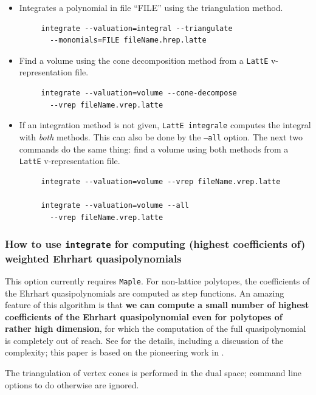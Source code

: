 \documentclass{article}
\newcommand{\latte}{{\tt LattE}\xspace}
\newcommand{\latteInt}{{\tt LattE integrale}\xspace}
\newcommand{\maple}{{\tt Maple}\xspace}
\begin{document}
\begin{itemize}
\item Integrates a polynomial in file ``FILE'' using the triangulation method. 
        \begin{verbatim}
     integrate --valuation=integral --triangulate 
       --monomials=FILE fileName.hrep.latte
        \end{verbatim}  
\item Find a volume using the cone decomposition method from a \latte v-representation file.
        \begin{verbatim}
     integrate --valuation=volume --cone-decompose 
       --vrep fileName.vrep.latte
        \end{verbatim}  
\item If an integration method is not given, \latteInt computes the integral with \emph{both} methods. This can also be done by the {\tt --all} option. The next two commands do the same thing: find a volume using both methods from a \latte v-representation file.
        \begin{verbatim}
     integrate --valuation=volume --vrep fileName.vrep.latte

     integrate --valuation=volume --all 
       --vrep fileName.vrep.latte 
        \end{verbatim}  
\end{itemize}


\subsubsection{How to use {\tt integrate} for computing (highest coefficients
  of) weighted Ehrhart quasi\-polynomials}           
\label{s:top-ehrhart}

This option currently requires \maple.
For non-lattice polytopes, the coefficients of the Ehrhart quasipolynomials
are computed as step functions.  An amazing
feature of this algorithm is that \textbf{we can compute a small number of highest
coefficients of the Ehrhart quasipolynomial even for polytopes of rather high
dimension}, for which the computation of the full quasipolynomial is
completely out of reach.
See \cite{so-called-paper-1} for the details, including a discussion of the
complexity; this paper is based on the pioneering work in
\cite{barvinok-2006-ehrhart-quasipolynomial}.   

The triangulation of vertex cones is performed in the dual space; command line
options to do otherwise are ignored.
\end{document}
